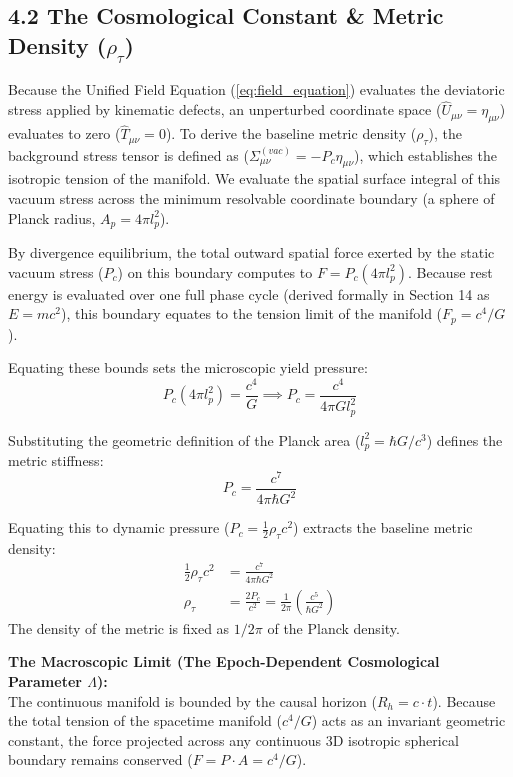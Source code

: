 \subsection*{4.2 The Cosmological Constant \& Metric Density ($\rho_\tau$)}
Because the Unified Field Equation (\ref{eq:field_equation}) evaluates the deviatoric stress applied by kinematic defects, an unperturbed coordinate space ($\hat{U}_{\mu\nu} = \eta_{\mu\nu}$) evaluates to zero ($\hat{T}_{\mu\nu} = 0$). To derive the baseline metric density ($\rho_\tau$), the background stress tensor is defined as ($\Sigma_{\mu\nu}^{(vac)} = -P_c \eta_{\mu\nu}$), which establishes the isotropic tension of the manifold. We evaluate the spatial surface integral of this vacuum stress across the minimum resolvable coordinate boundary (a sphere of Planck radius, $A_p = 4\pi l_p^2$).

By divergence equilibrium, the total outward spatial force exerted by the static vacuum stress ($P_c$) on this boundary computes to $F = P_c (4\pi l_p^2)$. Because rest energy is evaluated over one full phase cycle (derived formally in Section 14 as $E = mc^2$), this boundary equates to the tension limit of the manifold ($F_p = c^4 / G$). 

Equating these bounds sets the microscopic yield pressure:
\begin{equation}
    P_c (4\pi l_p^2) = \frac{c^4}{G} \implies P_c = \frac{c^4}{4\pi G l_p^2}
\end{equation}

Substituting the geometric definition of the Planck area ($l_p^2 = \hbar G / c^3$) defines the metric stiffness:
\begin{equation}
    P_c = \frac{c^7}{4\pi \hbar G^2}
\end{equation}

Equating this to dynamic pressure ($P_c = \frac{1}{2}\rho_\tau c^2$) extracts the baseline metric density:
\begin{align}
    \frac{1}{2}\rho_\tau c^2 &= \frac{c^7}{4\pi \hbar G^2} \nonumber \\
    \rho_\tau &= \frac{2 P_c}{c^2} = \frac{1}{2\pi} \left( \frac{c^5}{\hbar G^2} \right) \label{eq:derived_rho_tau}
\end{align}
The density of the metric is fixed as $1/2\pi$ of the Planck density.

\vspace{0.2 cm}

\textbf{The Macroscopic Limit (The Epoch-Dependent Cosmological Parameter $\Lambda$):} \\ 
The continuous manifold is bounded by the causal horizon ($R_h = c\cdot t$). Because the total tension of the spacetime manifold ($c^4/G$) acts as an invariant geometric constant, the force projected across any continuous 3D isotropic spherical boundary remains conserved ($F = P \cdot A = c^4/G$). 

